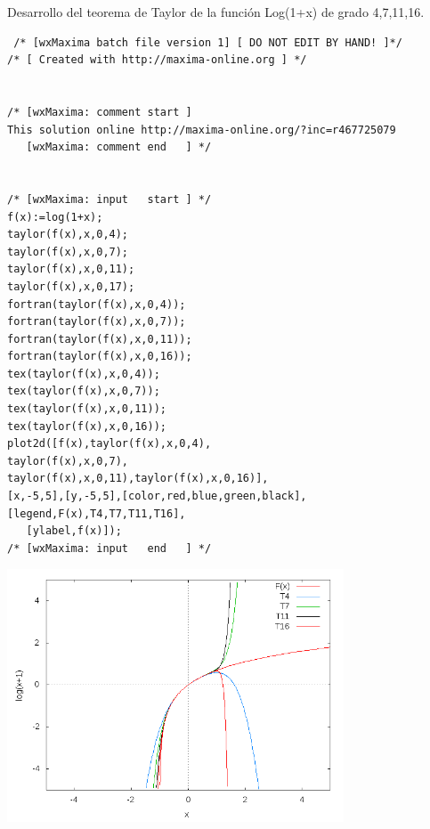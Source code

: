 \documentclass[12pt]{article}
\begin{document}
 
 
 \hspace {0.5cm}


 Desarrollo del teorema de Taylor de la función Log(1+x) de grado 4,7,11,16.
 \begin{verbatim}
 /* [wxMaxima batch file version 1] [ DO NOT EDIT BY HAND! ]*/
/* [ Created with http://maxima-online.org ] */


/* [wxMaxima: comment start ]
This solution online http://maxima-online.org/?inc=r467725079
   [wxMaxima: comment end   ] */


/* [wxMaxima: input   start ] */
f(x):=log(1+x);
taylor(f(x),x,0,4);
taylor(f(x),x,0,7);
taylor(f(x),x,0,11);
taylor(f(x),x,0,17);
fortran(taylor(f(x),x,0,4));
fortran(taylor(f(x),x,0,7));
fortran(taylor(f(x),x,0,11));
fortran(taylor(f(x),x,0,16));
tex(taylor(f(x),x,0,4));
tex(taylor(f(x),x,0,7));
tex(taylor(f(x),x,0,11));
tex(taylor(f(x),x,0,16));
plot2d([f(x),taylor(f(x),x,0,4),
taylor(f(x),x,0,7),
taylor(f(x),x,0,11),taylor(f(x),x,0,16)],
[x,-5,5],[y,-5,5],[color,red,blue,green,black],[legend,F(x),T4,T7,T11,T16],
   [ylabel,f(x)]);
/* [wxMaxima: input   end   ] */
 \end{verbatim}
 
  \begin{center}
  
    \includegraphics[width=10cm]{lod.png}
  \end{center}
 
 
 
 
 
 \hspace {0.5cm}
 
\end{document}
